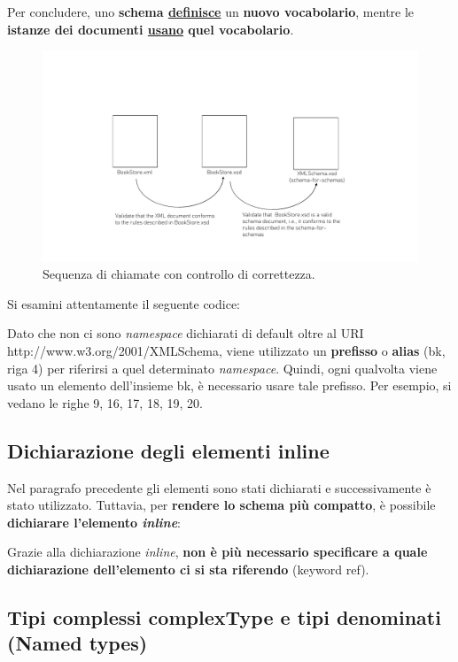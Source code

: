 \documentclass[a4paper]{article}
\begin{document}
	\noindent
	Per concludere, uno \textbf{schema \underline{definisce}} un \textbf{nuovo vocabolario}, mentre le \textbf{istanze dei documenti \underline{usano} quel vocabolario}.\newpage
	
	\begin{figure}[!htp]
		\centering
		\includegraphics[width=\textwidth]{img/xml-calls-xsd.pdf}
		\caption{Sequenza di chiamate con controllo di correttezza.}
	\end{figure}
	
	\noindent
	Si esamini attentamente il seguente codice:
	
	Dato che non ci sono \emph{namespace} dichiarati di default oltre al URI \textsf{http://www.w3.org/2001/XMLSchema}, viene utilizzato un \textbf{prefisso} o \textbf{alias} (\textsf{bk}, riga 4) per riferirsi a quel determinato \emph{namespace}. Quindi, ogni qualvolta viene usato un elemento dell'insieme \textsf{bk}, è necessario usare tale prefisso. Per esempio, si vedano le righe 9, 16, 17, 18, 19, 20.\newpage
	
	\subsection{Dichiarazione degli elementi inline}
	
	Nel paragrafo precedente gli elementi sono stati dichiarati e successivamente è stato utilizzato. Tuttavia, per \textbf{rendere lo schema più compatto}, è possibile \textbf{dichiarare l'elemento \emph{inline}}:
	
	Grazie alla dichiarazione \emph{inline}, \textbf{non è più necessario specificare a quale dichiarazione dell'elemento ci si sta riferendo} (keyword \textsf{ref}).\newpage
	
	\subsection{Tipi complessi \textsf{complexType} e tipi denominati (\textsf{Named types})}\label{complexType}
	
\end{document}
